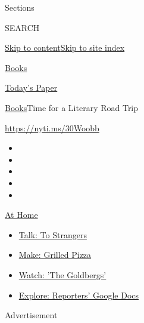 Sections

SEARCH

\protect\hyperlink{site-content}{Skip to
content}\protect\hyperlink{site-index}{Skip to site index}

\href{https://www.nytimes3xbfgragh.onion/section/books}{Books}

\href{https://myaccount.nytimes3xbfgragh.onion/auth/login?response_type=cookie\&client_id=vi}{}

\href{https://www.nytimes3xbfgragh.onion/section/todayspaper}{Today's
Paper}

\href{/section/books}{Books}\textbar{}Time for a Literary Road Trip

\url{https://nyti.ms/30Woobb}

\begin{itemize}
\item
\item
\item
\item
\item
\end{itemize}

\href{https://www.nytimes3xbfgragh.onion/spotlight/at-home?action=click\&pgtype=Article\&state=default\&region=TOP_BANNER\&context=at_home_menu}{At
Home}

\begin{itemize}
\tightlist
\item
  \href{https://www.nytimes3xbfgragh.onion/2020/08/03/well/family/the-benefits-of-talking-to-strangers.html?action=click\&pgtype=Article\&state=default\&region=TOP_BANNER\&context=at_home_menu}{Talk:
  To Strangers}
\item
  \href{https://www.nytimes3xbfgragh.onion/2020/08/01/at-home/coronavirus-make-pizza-on-a-grill.html?action=click\&pgtype=Article\&state=default\&region=TOP_BANNER\&context=at_home_menu}{Make:
  Grilled Pizza}
\item
  \href{https://www.nytimes3xbfgragh.onion/2020/07/31/arts/television/goldbergs-abc-stream.html?action=click\&pgtype=Article\&state=default\&region=TOP_BANNER\&context=at_home_menu}{Watch:
  'The Goldbergs'}
\item
  \href{https://www.nytimes3xbfgragh.onion/interactive/2020/at-home/even-more-reporters-editors-diaries-lists-recommendations.html?action=click\&pgtype=Article\&state=default\&region=TOP_BANNER\&context=at_home_menu}{Explore:
  Reporters' Google Docs}
\end{itemize}

Advertisement

